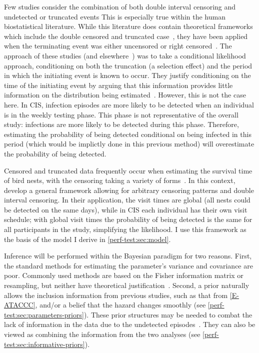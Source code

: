 \documentclass[thesis.tex]{subfiles}
\begin{document}
Few studies consider the combination of both double interval censoring and undetected or truncated events
This is especially true within the human biostatistical literature.
While this literature does contain theoretical frameworks which include the double censored and truncated case~\autocites{turnbullEmpirical}{dempsterMaximum}, they have been applied when the terminating event was either uncensored or right censored~\autocite{sunEmpirical,bacchettiNonparametric}.
The approach of these studies (and elsewhere~\autocite{shenNonparametric}) was to take a conditional likelihood approach, conditioning on both the truncation (a selection effect) and the period in which the initiating event is known to occur.
They justify conditioning on the time of the initiating event by arguing that this information provides little information on the distribution being estimated~.
However, this is not the case here.
In CIS, infection episodes are more likely to be detected when an individual is in the weekly testing phase.
This phase is not representative of the overall study: infections are more likely to be detected during this phase.
Therefore, estimating the probability of being detected conditional on being infected in this period (which would be implictly done in this previous method)  will overestimate the probability of being detected.

Censored and truncated data frequently occur when estimating the survival time of bird nests, with the censoring taking a variety of forms~\autocite{heiseyABCs}.
In this context, \textcite{heiseyModelling} develop a general framework allowing for arbitrary censoring patterns and double interval censoring.
In their application, the visit times are global (all nests could be detected on the same days), while in CIS each individual has their own visit schedule; with global visit times the probability of being detected is the same for all participants in the study, simplifying the likelihood.
I use this framework as the basis of the model I derive in \cref{perf-test:sec:model}.

Inference will be performed within the Bayesian paradigm for two reasons.
First, the standard methods for estimating the parameter's variance and covariance are poor.
Commonly used methods are based on the Fisher information matrix or resampling, but neither have theoretical justification~\autocite[230]{sunAnalysis}.
Second, a prior naturally allows the inclusion information from previous studies, such as that from \cref{E-ATACCC}, and/or a belief that the hazard changes smoothly (see \cref{perf-test:sec:parameters-priors}).
These prior structures may be needed to combat the lack of information in the data due to the undetected episodes~\autocite{caoBias}.
They can also be viewed as combining the information from the two analyses (see \cref{perf-test:sec:informative-priors}).
\end{document}
